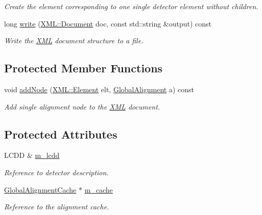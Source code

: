 \begin{DoxyCompactItemize}
\begin{DoxyCompactList}\small\item\em Create the element corresponding to one single detector element without children. \item\end{DoxyCompactList}\item 
long \hyperlink{class_d_d4hep_1_1_alignments_1_1_global_alignment_writer_a77a80a0fe5b34402eccd45e9d1fdd420}{write} (\hyperlink{class_d_d4hep_1_1_x_m_l_1_1_document}{XML::Document} doc, const std::string \&output) const 
\begin{DoxyCompactList}\small\item\em Write the \hyperlink{namespace_d_d4hep_1_1_x_m_l}{XML} document structure to a file. \item\end{DoxyCompactList}\end{DoxyCompactItemize}
\subsection*{Protected Member Functions}
\begin{DoxyCompactItemize}
\item 
void \hyperlink{class_d_d4hep_1_1_alignments_1_1_global_alignment_writer_ad30459403177b3f6a4fd0e6a4f6d5165}{addNode} (\hyperlink{class_d_d4hep_1_1_x_m_l_1_1_element}{XML::Element} elt, \hyperlink{class_d_d4hep_1_1_alignments_1_1_global_alignment}{GlobalAlignment} a) const 
\begin{DoxyCompactList}\small\item\em Add single alignment node to the \hyperlink{namespace_d_d4hep_1_1_x_m_l}{XML} document. \item\end{DoxyCompactList}\end{DoxyCompactItemize}
\subsection*{Protected Attributes}
\begin{DoxyCompactItemize}
\item 
LCDD \& \hyperlink{class_d_d4hep_1_1_alignments_1_1_global_alignment_writer_a831748e7145b8b3b95da4e0b87a49f5f}{m\_\-lcdd}
\begin{DoxyCompactList}\small\item\em Reference to detector description. \item\end{DoxyCompactList}\item 
\hyperlink{class_d_d4hep_1_1_alignments_1_1_global_alignment_cache}{GlobalAlignmentCache} $\ast$ \hyperlink{class_d_d4hep_1_1_alignments_1_1_global_alignment_writer_a467b49352cf36fef9e92b1dfa407edec}{m\_\-cache}
\begin{DoxyCompactList}\small\item\em Reference to the alignment cache. \item\end{DoxyCompactList}\end{DoxyCompactItemize}


